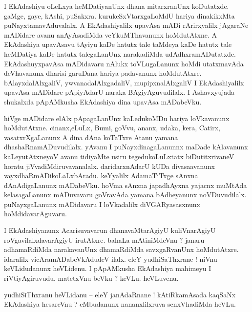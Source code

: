 \documentclass{article}
\begin{document}
\begin{mn}%
I EkAdashiyu oLeLxya heMDatiyanUnx dhana mitarxranUnx koDutatxde. gaMge, gaye, kAshi, puSakxra. 
kurukeSxVtarxgaLoMdU hariya dinakikxMta puNayxtamavAduvalalx. A EkAdashiyalilx upavAsa mADi 
rArirxyalilx jAgaraNe mADidare avanu anAyAsadiMda veYkuMThavanunx hoMdutAtxne. A EkAdashiya 
upavAsavu tAyiyu kaDe hatutx tale taMdeya kaDe hatutx tale heMDatiya kaDe hatutx talegaLanUnx 
narakadiMda udAdhxramADutatxde. EkAdashuyxpavAsa mADidavaru nAlukx toVLugaLanunx hoMdi utatxmavAda 
deVhavanunx dharisi garuDana hariya padavanunx hoMdutAtxre. bAlayxdalAlxgaliV, 
ywvanadalAlxgadaliV, mupipxnalAlxgaliV I EkAdashiyalilx upavAsa mADidare pApiyAdarU naraka 
BAgiyAguvudilalx. I Ashavxyujada shukalxda pApAMkusha EkAdashiya dina upavAsa mADabeVku.
\end{mn}

\begin{mn}%
hiVge mADidare elAlx pApagaLanUnx kaLedukoMDu hariya loVkavanunx hoMdutAtxne. cinanx,eLuLx, Bumi, 
goVvu, ananx, udaka, kera, Catirx, vasatxrXgaLanunx A dina dAna koTaTxre Atanu yamana 
dhashaRnamADuvudilalx. yAvanu I puNayxdinagaLanunnx maDade kAlavanunx kaLeyutAtxneyoV avanu 
tidiyaMte usiru tegedukoLuLxtatx biDutitxrivaneV horatu jiVvadiMdiruvavanalalx. daridarxnAdarU 
kUDa divasaavanunx vayxdhaRmADikoLaLxbAradu. keYyalilx AdamaTiTxge sAnxna dAnAdigaLanunx 
mADabeVku. hoVma sAnxna japadhAyxna yajacnx muMtAda kelasagaLanunx mADuvavaru goVravAda yamana 
bAdheyanunx noVDuvudilalx. puNayxgaLanunx mADidavaru I loVkadalilx diVGARyasasxnunx 
hoMdidavarAguvaru.
\end{mn}

\begin{mn}%
I EkAdashiyanunx Acarisuvavarun dhanavaMtarAgiyU kuliVnarAgiyU roVgavilalxdavarAgiyU irutAtxre. 
bahaLa mAtiniMdeVnu ? janaru adhamaRdiMda narakavanUnx dhamaRdiMda savxgaRvanUnx hoMdutAtxre. 
idaralilx vicAramADabeVkAdudeV ilalx. eleY yudhiSaThxrane ! niVnu keVLidudanunx heVLidenu. I 
pApAMkusha EkAdashiya mahimeyu I riVtiyAgiruvudu. matetxVnu beVku ? keVLu. heVLuvenu.
\end{mn}


\begin{mn}%
yudhiSiThxranu heVLidanu -- eleY janAdaRnane ! kAtiRkamAsada kaqSaNx EkAdashiya hesareVnu ? 
eMbudanunx nananxlilxruva senxVhadiMda heVLu.
\end{mn}
\end{document}
